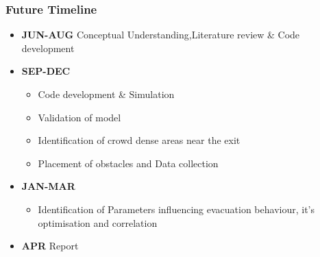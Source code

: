 \documentclass{beamer}
\begin{document}
\begin{frame}    \frametitle{Future Timeline}
\begin{itemize}
	\item \textbf{JUN-AUG} Conceptual Understanding,Literature review \& Code development 
	\item \textbf{SEP-DEC}
	\begin{itemize}
		\item Code development \& Simulation
		\item Validation of model
		\item Identification of crowd dense areas near the exit
		\item Placement of obstacles and Data collection  
	\end{itemize}
	\item \textbf{JAN-MAR} 
	\begin{itemize}
		\item Identification of Parameters influencing evacuation behaviour, it's optimisation and correlation  
	\end{itemize}
	\item \textbf{APR} Report
\end{itemize}
\end{frame}
\end{document}
